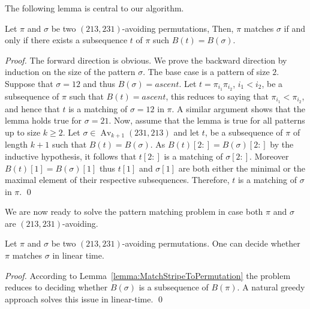 \documentclass[a4paper]{llncs}
\DeclareMathOperator{\Avd}{Av}
\newcommand\Av[2]{\Avd_{{#1}}({#2})}
\newcommand{\bijection}{B}
\begin{document}
The following lemma is central to our algorithm.

\begin{lemma}
\label{lemma:MatchStripeToPermutation}
Let $\pi$ and $\sigma$ be two $(213,231)$-avoiding permutations,
Then, $\pi$ matches $\sigma$ if and only if 
there exists a subsequence $t$ of $\pi$ such $\bijection(t)=\bijection(\sigma)$.
\end{lemma}

\begin{proof}
  The forward direction is obvious.
  We prove the backward direction by induction on the size of the pattern
  $\sigma$.
  The base case is a pattern of size $2$.
  Suppose that $\sigma = 12$ and thus $\bijection(\sigma) = ascent$.
  Let $t = \pi_{i_1}\pi_{i_2}$, $i_1 < i_2$, be a subsequence of $\pi$
  such that $\bijection(t) = ascent$, this reduces to saying that
  $\pi_{i_1} < \pi_{i_2}$, 
  and hence that $t$ is a matching of $\sigma = 12$ in $\pi$.
  A similar argument shows that the lemma holds true for $\sigma = 21$.
  Now, assume that the lemma is true for all patterns up to size $k \geq 2$.
  Let $\sigma \in \Av{k+1}{231,213}$ and
  let $t$,
  be a subsequence of $\pi$ of length $k+1$ such that
  $\bijection(t) = \bijection(\sigma)$.
  As $\bijection(t)[2:] = \bijection(\sigma)[2:]$
  by the inductive hypothesis, it follows that
  $t[2:]$ is a matching of $\sigma[2:]$.
  Moreover $\bijection(t)[1] = \bijection(\sigma)[1]$ 
  thus $t[1]$ and $\sigma[1]$ are both either the minimal or the maximal
  element of their respective subsequences.
  Therefore, $t$ is a matching of $\sigma$ in $\pi$.
  \qed
\end{proof}

We are now ready to solve the pattern matching problem in case
both $\pi$ and $\sigma$ are $(213, 231)$-avoiding.

\begin{proposition}
	\label{Proposition:both permutations are avoiding}
	Let $\pi$ and $\sigma$ be two $(213,231)$-avoiding permutations.
	One can decide whether $\pi$ matches $\sigma$ in linear time.
\end{proposition}

\begin{proof}
According to Lemma~\ref{lemma:MatchStripeToPermutation} the problem reduces
to deciding whether $\bijection(\sigma)$ is a subsequence of $\bijection(\pi)$.
A natural greedy approach solves this issue in linear-time.
\qed
\end{proof}
\end{document}
